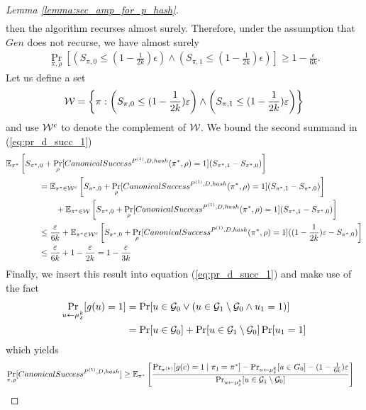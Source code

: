 \begin{proof}[Lemma \ref{lemma:sec_amp_for_p_hash}]
\begin{align}
\end{align}
then the algorithm recurses almost surely.
Therefore, under the assumption that $Gen$ does not recurse, we have almost surely
\begin{align}
\underset{\pi, \rho}{\Pr}\left[\left(S_{\pi,0} \leq (1 - \frac{1}{2k})\epsilon\right) \land \left( S_{\pi,1} \leq (1-\frac{1}{2k})\epsilon\right)\right] \geq 1 - \frac{\epsilon}{6k}.
\end{align}
Let us define a set
\begin{align}
  \mathcal{W} = \left\{ \pi :  \left(S_{\pi,0} \leq (1 - \frac{1}{2k})\varepsilon\right) \land \left( S_{\pi,1} \leq (1-\frac{1}{2k})\varepsilon \right) \right\}
\end{align}
and use $\mathcal{W}^c$ to denote the complement of $\mathcal{W}$.
We bound the second summand in (\ref{eq:pr_d_succ_1})
\begin{align}
&\mathbb{E}_{\pi^*}\left[ S_{\pi^*,0} + \Pr_{\rho} [CanonicalSuccess^{P^{(1)}, D, hash} (\pi^*, \rho) = 1](S_{\pi^*,1} - S_{\pi^*,0}) \right] \notag\\
&\mbox\qquad\qquad = \mathbb{E}_{\pi^* \in \mathcal{W}^c}\left[ S_{\pi^*,0} + \Pr_{\rho} [CanonicalSuccess^{P^{(1)}, D, hash}(\pi^*, \rho) = 1](S_{\pi^*,1} - S_{\pi^*,0}) \right] \notag\\
&\mbox\qquad\qquad\qquad +  \mathbb{E}_{\pi^* \in \mathcal{W}}\left[ S_{\pi^*,0} + \Pr_{\rho} [CanonicalSuccess^{P^{(1)}, D, hash}(\pi^*, \rho) = 1](S_{\pi^*,1} - S_{\pi^*,0}) \right] \notag\\
&\mbox\qquad\qquad \leq \frac{\varepsilon}{6k} + \mathbb{E}_{\pi^* \in \mathcal{W}^c}\left[ S_{\pi^*,0} + \Pr_{\rho} [CanonicalSuccess^{P^{(1)}, D, hash}(\pi^*, \rho) = 1]((1 - \frac{1}{2k})\varepsilon - S_{\pi^*,0}) \right] \notag\\
&\mbox\qquad\qquad \leq \frac{\varepsilon}{6k} + 1 - \frac{\varepsilon}{2k} = 1 - \frac{\varepsilon}{3k}
\end{align}
Finally, we insert this result into equation (\ref{eq:pr_d_succ_1}) and make use of the fact
\begin{align*}
\underset{u \leftarrow \mu_{\delta}^k}{\Pr}[g(u) = 1]
&= \Pr[u \in \mathcal{G}_0 \lor ( u \in \mathcal{G}_1 \setminus \mathcal{G}_0 \land u_1 = 1)] \notag\\
&= \Pr[u \in \mathcal{G}_0] + \Pr[u \in \mathcal{G}_1 \setminus \mathcal{G}_0] \Pr[u_1 = 1]
\end{align*}
which yields
\begin{align*}
  \underset{\pi, \rho}{\Pr}[CanonicalSuccess^{P^{(1)}, D, hash}]
&\geq \mathbb{E}_{\pi^*}\left[\frac{{\Pr}_{\pi^{(k)}}[g(c) = 1 \mid \pi_1 = \pi^*] -
{\Pr}_{u \leftarrow \mu_{\delta}^{k}}[u \in G_0] - (1 - \frac{1}{6k})\epsilon} {\Pr_{u \leftarrow \mu_{\delta}^{k}}[u \in \cG_1 \setminus \cG_0]}\right] \notag

\end{align*}
\end{proof}
